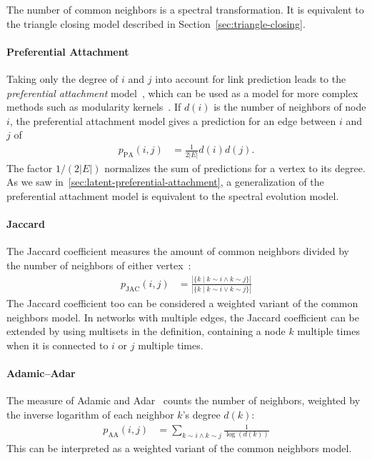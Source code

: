 \documentclass[11pt,a4paper]{book}
\begin{document}
The number of common neighbors is a spectral transformation.  It is
equivalent to the triangle closing model described in
Section~\ref{sec:triangle-closing}. 

\paragraph{Preferential Attachment}
Taking only the degree of $i$ and $j$ into account for link prediction
leads to the \emph{preferential attachment} model~\cite{b439}, which can
be used as a model for more complex methods such as modularity
kernels~\cite{b401,b413}.
If $d(i)$ is the number of neighbors of node $i$, the preferential
attachment model gives a prediction for an edge between $i$ and $j$ of 
\begin{align}
  p_{\mathrm{PA}}(i,j) &= \frac 1 {2|E|}  d(i) d(j).
  \label{eq:preferential-attachment}
\end{align}
The factor $1/(2|E|)$
normalizes the sum of predictions for a vertex to its degree. 
As we saw in~\ref{sec:latent-preferential-attachment}, a generalization
of the preferential attachment 
model is equivalent to the spectral evolution model. 

\paragraph{Jaccard}
The Jaccard coefficient measures the amount of common neighbors
divided by the number of neighbors of either vertex~\cite{b256}: 
\begin{align}
  p_{\mathrm{JAC}}(i,j) &= \frac {|\{ k \mid k \sim i \land k \sim j \}|}  {|\{ k
    \mid k \sim i \lor k \sim j \}|}  
  \label{eq:jaccard}
\end{align}
The Jaccard coefficient too can be considered a weighted variant of the
common neighbors model. 
In networks with multiple edges, the Jaccard coefficient can be extended
by using multisets in the definition, containing a node $k$ multiple
times when it is connected to $i$ or $j$ multiple times.  

\paragraph{Adamic--Adar}
The measure of Adamic and Adar~\cite{b475} counts the number of
neighbors, weighted by the inverse logarithm of each neighbor $k$'s
degree $d(k)$: 
\begin{align}
  p_{\mathrm{AA}}(i,j) &= \sum_{k \sim i \wedge k \sim j} \frac 1 {\log(d(k))} 
  \label{eq:adamic-adar}
\end{align}
This can be interpreted as a weighted variant of the common neighbors
model.  
\end{document}
